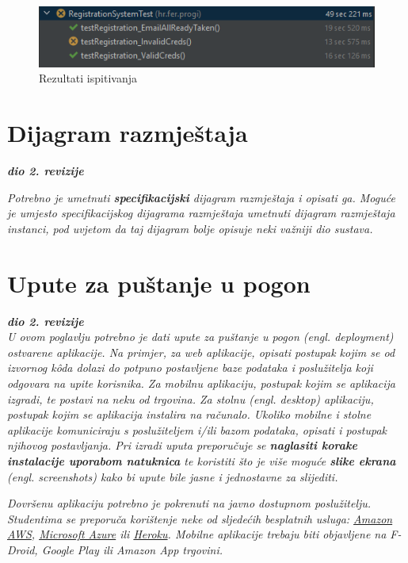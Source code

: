 			\begin{figure}[H]
				\includegraphics[scale=1]{slike/registrationTests.png} 
				\centering
				\caption{Rezultati ispitivanja}
				\label{fig:promjene}
			\end{figure}
			
			\eject 
		
		
		\section{Dijagram razmještaja}
			
			\textbf{\textit{dio 2. revizije}}
			
			 \textit{Potrebno je umetnuti \textbf{specifikacijski} dijagram razmještaja i opisati ga. Moguće je umjesto specifikacijskog dijagrama razmještaja umetnuti dijagram razmještaja instanci, pod uvjetom da taj dijagram bolje opisuje neki važniji dio sustava.}
			
			\eject 
		
		\section{Upute za puštanje u pogon}
		
			\textbf{\textit{dio 2. revizije}}\\
		
			 \textit{U ovom poglavlju potrebno je dati upute za puštanje u pogon (engl. deployment) ostvarene aplikacije. Na primjer, za web aplikacije, opisati postupak kojim se od izvornog kôda dolazi do potpuno postavljene baze podataka i poslužitelja koji odgovara na upite korisnika. Za mobilnu aplikaciju, postupak kojim se aplikacija izgradi, te postavi na neku od trgovina. Za stolnu (engl. desktop) aplikaciju, postupak kojim se aplikacija instalira na računalo. Ukoliko mobilne i stolne aplikacije komuniciraju s poslužiteljem i/ili bazom podataka, opisati i postupak njihovog postavljanja. Pri izradi uputa preporučuje se \textbf{naglasiti korake instalacije uporabom natuknica} te koristiti što je više moguće \textbf{slike ekrana} (engl. screenshots) kako bi upute bile jasne i jednostavne za slijediti.}
			
			
			 \textit{Dovršenu aplikaciju potrebno je pokrenuti na javno dostupnom poslužitelju. Studentima se preporuča korištenje neke od sljedećih besplatnih usluga: \href{https://aws.amazon.com/}{Amazon AWS}, \href{https://azure.microsoft.com/en-us/}{Microsoft Azure} ili \href{https://www.heroku.com/}{Heroku}. Mobilne aplikacije trebaju biti objavljene na F-Droid, Google Play ili Amazon App trgovini.}
			
			
			\eject 